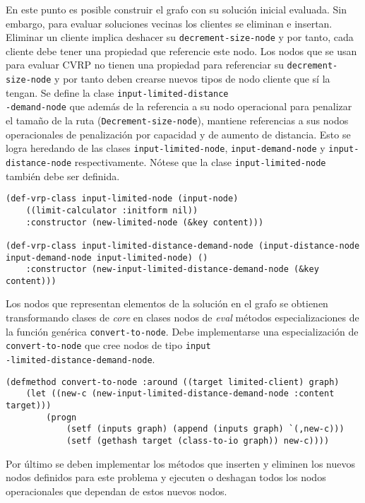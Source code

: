 En este punto es posible construir el grafo con su solución inicial evaluada. Sin embargo, para evaluar soluciones vecinas los clientes se eliminan e insertan. Eliminar un cliente implica deshacer su \texttt{decrement-size-node} y por tanto, cada cliente debe tener una propiedad que referencie este nodo. Los nodos que se usan para evaluar CVRP no tienen una propiedad para referenciar su \texttt{decrement-size-node} y por tanto deben crearse nuevos tipos de nodo cliente que sí la tengan. Se define la clase \texttt{input-limited-distance\\$  $-demand-node} que además de la referencia a su nodo operacional para penalizar el tamaño de la ruta (\texttt{Decrement-size-node}), mantiene referencias a sus nodos operacionales de penalización por capacidad y de aumento de distancia. Esto se logra heredando de las clases 
\texttt{input-limited-node}, \texttt{input-demand-node} y \texttt{input-distance-node} respectivamente. Nótese que la clase \texttt{input-limited-node} también debe ser definida.

\begin{lstlisting}
(def-vrp-class input-limited-node (input-node) 
	((limit-calculator :initform nil))
	:constructor (new-limited-node (&key content)))

(def-vrp-class input-limited-distance-demand-node (input-distance-node input-demand-node input-limited-node) ()
	:constructor (new-input-limited-distance-demand-node (&key content)))
\end{lstlisting}

Los nodos que representan elementos de la solución en el grafo se obtienen transformando clases de \textit{core} en clases nodos de \textit{eval} métodos especializaciones de la función genérica \texttt{convert-to-node}. Debe implementarse una especialización de \texttt{convert-to-node} que cree nodos de tipo \texttt{input\\-limited-distance-demand-node}.

\begin{lstlisting}
(defmethod convert-to-node :around ((target limited-client) graph)
	(let ((new-c (new-input-limited-distance-demand-node :content target)))
		(progn
			(setf (inputs graph) (append (inputs graph) `(,new-c)))
			(setf (gethash target (class-to-io graph)) new-c))))
\end{lstlisting}

Por último se deben implementar los métodos que inserten y eliminen los nuevos nodos definidos para este problema y ejecuten o deshagan todos los nodos operacionales que dependan de estos nuevos nodos.

